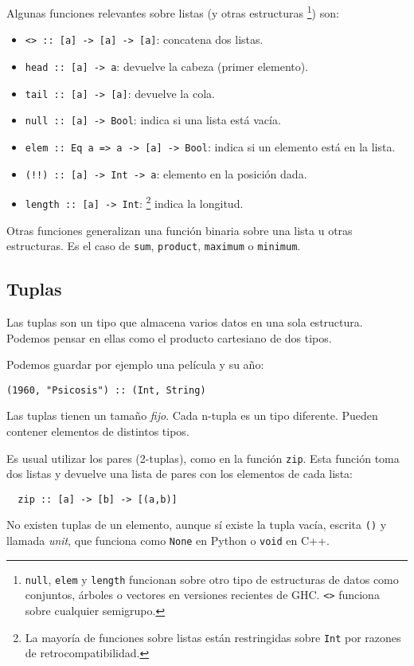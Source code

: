 Algunas funciones relevantes sobre listas (y otras estructuras \footnote{\texttt{null}, \texttt{elem} y \texttt{length} funcionan sobre otro tipo de estructuras de datos como conjuntos, árboles o vectores en versiones recientes de GHC. \texttt{<>} funciona sobre cualquier semigrupo.}) son:

\begin{itemize}
  \item \texttt{<> :: [a] -> [a] -> [a]}: concatena dos listas.
  \item \texttt{head :: [a] -> a}: devuelve la cabeza (primer elemento).
  \item \texttt{tail :: [a] -> [a]}: devuelve la cola.
  \item \texttt{null :: [a] -> Bool}: indica si una lista está vacía.
  \item \texttt{elem :: Eq a => a -> [a] -> Bool}: indica si un elemento está en la lista.
  \item \texttt{(!!) :: [a] -> Int -> a}: elemento en la posición dada.
  \item \texttt{length :: [a] -> Int}:
  \footnote{La mayoría de funciones sobre listas están restringidas sobre \texttt{Int}
  por razones de retrocompatibilidad.} indica la longitud.
\end{itemize}

Otras funciones generalizan una función binaria sobre una lista u otras estructuras. Es el caso de
\texttt{sum}, \texttt{product}, \texttt{maximum} o \texttt{minimum}.

\subsection{Tuplas}
Las tuplas son un tipo que almacena varios datos en una sola estructura.
Podemos pensar en ellas como el producto cartesiano de dos tipos.

Podemos guardar por ejemplo una película y su año:

\begin{lstlisting}
(1960, "Psicosis") :: (Int, String)
\end{lstlisting}

Las tuplas tienen un tamaño \textit{fijo}. Cada n-tupla es un tipo diferente.
Pueden contener elementos de distintos tipos.

Es usual utilizar los pares (2-tuplas), como en la función \texttt{zip}.
Esta función toma dos listas y devuelve una lista de pares con los elementos de
cada lista:

\begin{lstlisting}
  zip :: [a] -> [b] -> [(a,b)]
\end{lstlisting}

No existen tuplas de un elemento, aunque sí existe la tupla vacía, escrita \texttt{()}
y llamada \textit{unit}, que funciona como \texttt{None} en Python o \texttt{void} en C++.
